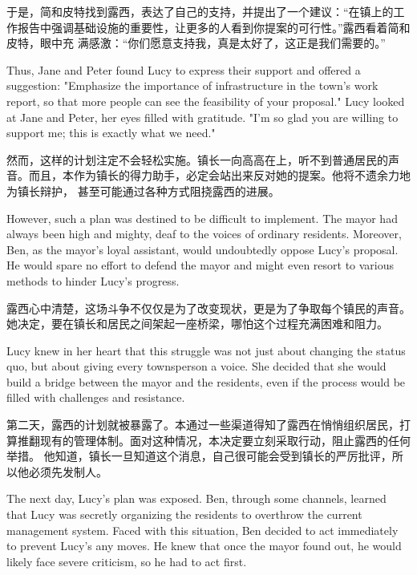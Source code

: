 于是，简和皮特找到露西，表达了自己的支持，并提出了一个建议：“在镇上的工作报告中强调基础设施的重要性，让更多的人看到你提案的可行性。”露西看着简和皮特，眼中充
满感激：“你们愿意支持我，真是太好了，这正是我们需要的。”

\begin{flushright}
    Thus, Jane and Peter found Lucy to express their support and offered a
    suggestion: "Emphasize the importance of infrastructure in the town's work
    report, so that more people can see the feasibility of your proposal." Lucy
    looked at Jane and Peter, her eyes filled with gratitude. "I'm so glad you are
    willing to support me; this is exactly what we need."
\end{flushright}

然而，这样的计划注定不会轻松实施。镇长一向高高在上，听不到普通居民的声音。而且，本作为镇长的得力助手，必定会站出来反对她的提案。他将不遗余力地为镇长辩护，
甚至可能通过各种方式阻挠露西的进展。

\begin{flushright} However, such a plan was destined to be difficult to
    implement. The mayor had always been high and mighty, deaf to the voices of
    ordinary residents. Moreover, Ben, as the mayor’s loyal assistant, would
    undoubtedly oppose Lucy’s proposal. He would spare no effort to defend the
    mayor and might even resort to various methods to hinder Lucy’s progress.
\end{flushright}

露西心中清楚，这场斗争不仅仅是为了改变现状，更是为了争取每个镇民的声音。她决定，要在镇长和居民之间架起一座桥梁，哪怕这个过程充满困难和阻力。

\begin{flushright} Lucy knew in her heart that this struggle was not just about
    changing the status quo, but about giving every townsperson a voice. She
    decided that she would build a bridge between the mayor and the residents,
    even
    if the process would be filled with challenges and resistance.
\end{flushright}

第二天，露西的计划就被暴露了。本通过一些渠道得知了露西在悄悄组织居民，打算推翻现有的管理体制。面对这种情况，本决定要立刻采取行动，阻止露西的任何举措。
他知道，镇长一旦知道这个消息，自己很可能会受到镇长的严厉批评，所以他必须先发制人。

\begin{flushright} The next day, Lucy’s plan was exposed. Ben, through some
    channels, learned that Lucy was secretly organizing the residents to
    overthrow
    the current management system. Faced with this situation, Ben decided to
    act
    immediately to prevent Lucy’s any moves. He knew that once the mayor found
    out,
    he would likely face severe criticism, so he had to act first.
\end{flushright}

